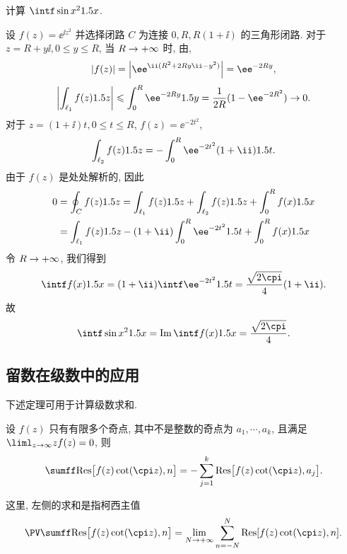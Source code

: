 \begin{example}[菲涅耳积分]
  计算 $\intf\sin x^2\d x$.
\end{example}

\begin{solution}
  设 $f(z)=\ee^{\ii z^2}$ 并选择闭路 $C$ 为连接 $0,R,R(1+\ii)$ 的三角形闭路.
  对于 $z=R+y\ii,0\le y\le R$, 当 $R\rightarrow+\infty$ 时, 由\thmGrowUp,
  \[
    |f(z)|=\abs{\ee^{\ii (R^2+2Ry\ii-y^2)}}=\ee^{-2Ry},
  \]
  \[
     \abs{\int_{\ell_1}f(z)\d z}
    \le \int_0^R \ee^{-2Ry}\d y
    =\frac1{2R}(1-\ee^{-2R^2})\ra 0.
  \]
  对于 $z=(1+\ii)t,0\le t\le R$, $f(z)=\ee^{-2t^2}$,
  \[
     \int_{\ell_2} f(z)\d z
    =-\int_0^R \ee^{-2t^2}(1+\ii)\d t.
  \]
  由于 $f(z)$ 是处处解析的, 因此
  \begin{align*}
     0&
    =\oint_C f(z)\d z
    =\int_{\ell_1} f(z)\d z+\int_{\ell_2} f(z)\d z
    +\int_0^R f(x)\d x\\&
    =\int_{\ell_1} f(z)\d z-(1+\ii)\int_0^R\ee^{-2t^2}\d t
    +\int_0^R f(x)\d x
  \end{align*}
  令 $R\rightarrow+\infty$, 我们得到
  \[
     \intf f(x)\d x
    =(1+\ii)\intf \ee^{-2t^2}\d t
    =\frac{\sqrt{2\cpi}}4(1+\ii).
  \]
  故
  \[
     \intf\sin x^2\d x
    =\Im \intf f(x)\d x
    =\frac{\sqrt{2\cpi}}4.
  \]
\end{solution}


\subsection{留数在级数中的应用\optional}

下述定理可用于计算级数求和.
\begin{theorem}
  \label{thm:sum-fcot-residue-zero}
  设 $f(z)$ 只有有限多个奇点, 其中不是整数的奇点为 $a_1,\cdots,a_k$, 且满足 $\liml_{z\ra\infty}zf(z)=0$, 则
  \[
    \sumff \Res\bigl[f(z)\cot(\cpi z),n\bigr]
    =-\sum_{j=1}^k \Res\bigl[f(z)\cot(\cpi z),a_j\bigr].
  \]
\end{theorem}
这里, 左侧的求和是指柯西主值
\[
  \PV\sumff \Res\bigl[f(z)\cot(\cpi z),n\bigr]
  =\lim_{N\ra+\infty}\sum_{n=-N}^N \Res[f(z)\cot(\cpi z),n].
\]

